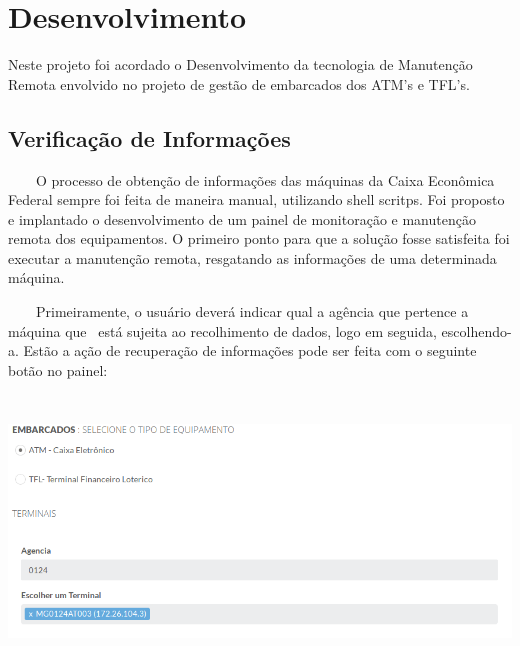 \chapter[Desenvolvimento ]{Desenvolvimento}
Neste projeto foi acordado o Desenvolvimento da tecnologia de Manutenção Remota envolvido no projeto de gestão de embarcados dos ATM’s e TFL’s.

\section{Verifica\c{c}\~ao de Informa\c{c}\~oes}

\bigskip

{\color{black}
    \ \ \ \ O processo de obten\c{c}\~ao de informa\c{c}\~oes das m\'aquinas da Caixa Econ\^omica Federal sempre foi feita
        de maneira manual, utilizando shell scritps. Foi proposto e implantado o desenvolvimento de um painel de
        monitora\c{c}\~ao e manuten\c{c}\~ao remota dos equipamentos. O primeiro ponto para que a solu\c{c}\~ao fosse
        satisfeita foi executar a manuten\c{c}\~ao remota, resgatando as informa\c{c}\~oes de uma determinada m\'aquina. }

{\color{black}
    \ \ \ \ Primeiramente, o usu\'ario dever\'a indicar qual a ag\^encia que pertence a m\'aquina que \ est\'a sujeita ao
        recolhimento de dados, logo em seguida, escolhendo-a. Est\~ao a a\c{c}\~ao de recupera\c{c}\~ao de informa\c{c}\~oes
        pode ser feita com o seguinte bot\~ao no painel:}

        \begin{center}
        \includegraphics[width=17.029cm,height=7.22cm]{figuras/RATCETECATMSTFLS051718v2-img002.png}
        \end{center}


